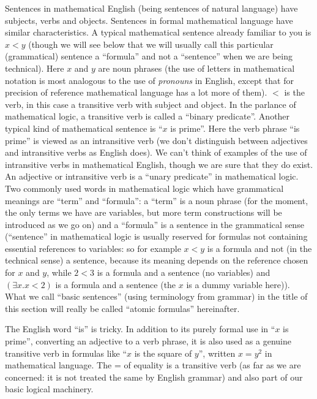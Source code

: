 \documentclass[12pt]{book}
\begin{document}
Sentences in mathematical English (being sentences of natural language) have
subjects, verbs and objects.  Sentences in formal mathematical
language have similar characteristics.  A typical mathematical
sentence already familiar to you is $x < y$ (though we will see below
that we will usually call this particular (grammatical) sentence a
``formula'' and not a ``sentence'' when we are being technical).  Here
$x$ and $y$ are noun phrases (the use of letters in mathematical
notation is most analogous to the use of {\em pronouns\/} in English,
except that for precision of reference mathematical language has a lot
more of them).  $<$ is the verb, in this case a transitive verb with
subject and object.  In the parlance of mathematical logic, a
transitive verb is called a ``binary predicate''.  Another typical
kind of mathematical sentence is ``$x$ is prime''.  Here the verb
phrase ``is prime'' is viewed as an intransitive verb (we don't
distinguish between adjectives and intransitive verbs as English
does).  We can't think of examples of the use of intransitive verbs in
mathematical English, though we are sure that they do exist.  An
adjective or intransitive verb is a ``unary predicate'' in
mathematical logic.  Two commonly used words in mathematical logic
which have grammatical meanings are ``term'' and ``formula'': a
``term'' is a noun phrase (for the moment, the only terms we have are
variables, but more term constructions will be introduced as we go on)
and a ``formula'' is a sentence in the grammatical sense (``sentence''
in mathematical logic is usually reserved for formulas not containing
essential references to variables: so for example $x < y$ is a formula
and not (in the technical sense) a sentence, because its meaning
depends on the reference chosen for $x$ and $y$, while $2<3$ is a
formula and a sentence (no variables) and $(\exists x.x<2)$ is a
formula and a sentence (the $x$ is a dummy variable here)).  What we
call ``basic sentences'' (using terminology from grammar) in the title
of this section will really be called ``atomic formulas'' hereinafter.

The English word ``is'' is tricky.  In addition to its purely formal
use in ``$x$ is prime'', converting an adjective to a verb phrase, it
is also used as a genuine transitive verb in formulas like ``$x$ is
the square of $y$'', written $x=y^2$ in mathematical language.  The =
of equality is a transitive verb (as far as we are concerned: it is
not treated the same by English grammar) and also part of our basic
logical machinery.
\end{document}
